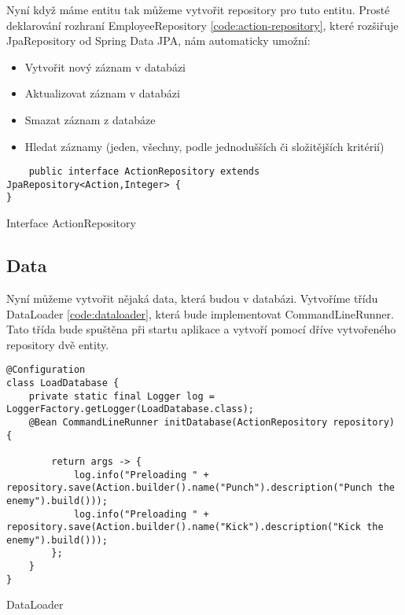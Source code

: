 Nyní když máme entitu tak můžeme vytvořit repository pro tuto entitu. Prosté deklarování rozhraní EmployeeRepository \ref{code:action-repository}, které rozšiřuje JpaRepository od Spring Data JPA, nám automaticky umožní:
\begin{itemize}
    \item Vytvořit nový záznam v databázi
    \item Aktualizovat záznam v databázi
    \item Smazat záznam z databáze
    \item Hledat záznamy (jeden, všechny, podle jednodušších či složitějších kritérií)
\end{itemize}

\begin{listing}[H]
    \begin{verbatim}
    public interface ActionRepository extends JpaRepository<Action,Integer> {
}
    \end{verbatim}
    \caption{Interface ActionRepository}
    \label{code:action-repository}
\end{listing}


\subsection{Data}
Nyní můžeme vytvořit nějaká data, která budou v databázi. Vytvoříme třídu DataLoader \ref{code:dataloader}, která bude implementovat CommandLineRunner. Tato třída bude spuštěna při startu aplikace a vytvoří pomocí dříve vytvořeného repository dvě entity.

\begin{listing}[H]
    \begin{verbatim}
@Configuration
class LoadDatabase {
    private static final Logger log = LoggerFactory.getLogger(LoadDatabase.class);
    @Bean CommandLineRunner initDatabase(ActionRepository repository) {

        return args -> {
            log.info("Preloading " + repository.save(Action.builder().name("Punch").description("Punch the enemy").build()));
            log.info("Preloading " + repository.save(Action.builder().name("Kick").description("Kick the enemy").build()));
        };
    }
}
    \end{verbatim}
    \caption{DataLoader}
    \label{code:dataloader}
\end{listing}

